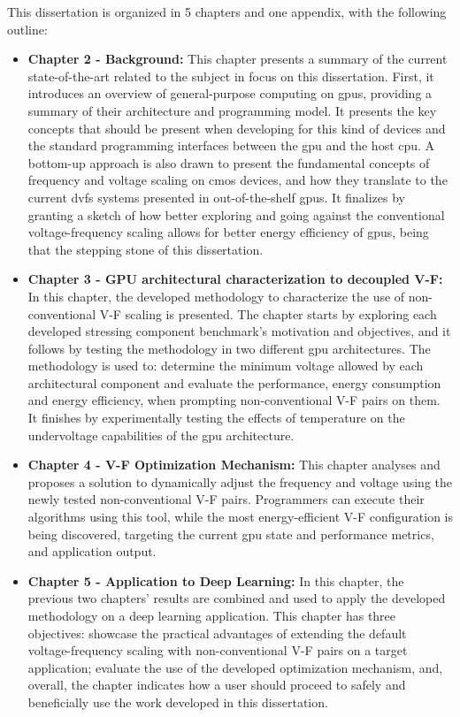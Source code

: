 This dissertation is organized in 5 chapters and one appendix, with the following outline:
\begin{itemize}
    \item \textbf{Chapter 2 - Background:} This chapter presents a summary of the current state-of-the-art related to the subject in focus on this dissertation. First, it introduces an overview of general-purpose computing on \acrshort{gpu}s, providing a summary of their architecture and programming model. It presents the key concepts that should be present when developing for this kind of devices and the standard programming interfaces between the \acrshort{gpu} and the host  \acrshort{cpu}. A bottom-up approach is also drawn to present the fundamental concepts of frequency and voltage scaling on \acrshort{cmos} devices, and how they translate to the current \acrshort{dvfs} systems presented in out-of-the-shelf \acrshort{gpu}s. It finalizes by granting a sketch of how better exploring and going against the conventional voltage-frequency scaling allows for better energy efficiency of \acrshort{gpu}s, being that the stepping stone of this dissertation. 
    \item \textbf{Chapter 3 - GPU architectural characterization to decoupled V-F:} In this chapter, the developed methodology to characterize the use of non-conventional V-F scaling is presented. The chapter starts by exploring each developed stressing component benchmark's motivation and objectives, and it follows by testing the methodology in two different \acrshort{gpu} architectures. The methodology is used to: determine the minimum voltage allowed by each architectural component and evaluate the performance, energy consumption and energy efficiency, when prompting non-conventional V-F pairs on them. It finishes by experimentally testing the effects of temperature on the undervoltage capabilities of the \acrshort{gpu} architecture.
    \item \textbf{Chapter 4 - V-F Optimization Mechanism:} This chapter analyses and proposes a solution to dynamically adjust the frequency and voltage using the newly tested non-conventional V-F pairs. Programmers can execute their algorithms using this tool, while the most energy-efficient V-F configuration is being discovered, targeting the current \acrshort{gpu} state and performance metrics, and application output.
    \item \textbf{Chapter 5 - Application to Deep Learning:} In this chapter, the previous two chapters' results are combined and used to apply the developed methodology on a deep learning application. This chapter has three objectives: showcase the practical advantages of extending the default voltage-frequency scaling with non-conventional V-F pairs on a target application; evaluate the use of the developed optimization mechanism, and, overall, the chapter indicates how a user should proceed to safely and beneficially use the work developed in this dissertation.

\end{itemize}
